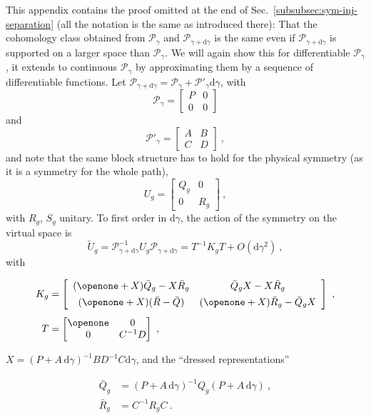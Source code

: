 \documentclass[twocolumn,superscriptaddress,prb,linenumbers]{revtex4-1}
\newcommand{\mc}[1]{\mathcal{#1}}
\newcommand{\dd}{\mathrm{d}}
\begin{document}
This appendix contains the proof omitted at the end of
Sec.~\ref{subsubsec:sym-inj-separation} (all the notation is the same as
introduced there): That the cohomology class obtained from $\mc P_\gamma$
and $\mc P_{\gamma+\dd\gamma}$ is the same even if $\mc
    P_{\gamma+\dd\gamma}$ is supported on a larger space than $\mc P_\gamma$.
We will again show this for differentiable $\mc P_\gamma$,
it extends to continuous $\mc P_\gamma$ by approximating them by a
sequence of differentiable functions.  Let
$\mc P_{\gamma+\dd\gamma}= \mc P_\gamma+\mc P'_\gamma\dd\gamma$,
with
\[
    \mc P_\gamma = \left[\begin{matrix}P&0\\0&0\end{matrix}\right]
\]
and
\[
    \mc P'_\gamma = \left[\begin{matrix}A&B\\C&D\end{matrix}\right]\ ,
\]
and note that the same block structure has to hold for the physical
symmetry (as it is a symmetry for the whole path),
\[
    U_g = \left[\begin{matrix}Q_g & 0 \\ 0 & R_g\end{matrix}\right]\ ,
\]
with $R_g$, $S_g$ unitary.  To first order in $\dd\gamma$, the action of
the symmetry on the virtual space is
\[
    \tilde U_g =
    \mc P_{\gamma+\dd\gamma}^{-1} U_g \mc P_{\gamma+\dd\gamma}
    = T^{-1}
    K_g
    T+O(\dd\gamma^2)\ ,
\]
with
\begin{linenomath}
    \begin{align*}
        K_g & =\left[\begin{array}{cc}
                             (\openone+X)\bar Q_g - X\bar R_g & \bar Q_g X - X \bar R_g         \\[4pt]
                             (\openone+X)(\bar R-\bar Q)      & (\openone+X)\bar R_g-\bar Q_g X
                         \end{array}\right]\ ,
        \\[4pt]
        T   & =\left[\begin{matrix} \openone & 0 \\0&C^{-1}D\end{matrix}\right]\ ,
    \end{align*}
\end{linenomath}
$X=(P+A\,\dd\gamma)^{-1}BD^{-1}C\dd\gamma$, and the ``dressed representations''
\begin{linenomath}
    \begin{align*}
        \bar Q_g & = (P+A\,\dd\gamma)^{-1} Q_g (P+A\,\dd\gamma)\ , \\
        \bar R_g & = C^{-1}R_g C\ .
    \end{align*}
\end{linenomath}
\end{document}
